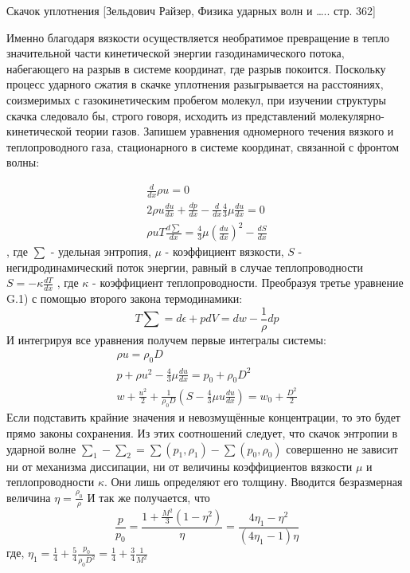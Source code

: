 \documentclass[10pt, a4paper]{article}
\numberwithin{equation}{section}
\begin{document}
Скачок уплотнения [Зельдович Райзер, Физика ударных волн и ….. стр. 362]


Именно благодаря вязкости осуществляется необратимое превращение в тепло значительной части кинетической энергии газодинамического потока, набегающего на разрыв в системе координат, где разрыв покоится. 
Поскольку процесс ударного сжатия в скачке уплотнения разыгрывается на расстояниях, соизмеримых с газокинетическим пробегом молекул, при изучении структуры скачка следовало бы, строго говоря, исходить из представлений молекулярно-кинетической теории газов. 
Запишем уравнения одномерного течения вязкого и теплопроводного газа, стационарного в системе координат, связанной с фронтом волны: 

\begin{eqnarray}
	\frac{d}{dx} \rho u =0 \\
	2 \rho u \frac{du}{dx} + \frac{dp}{dx}-\frac{d}{dx} \frac{4}{3} \mu \frac{du}{dx} =0 \\
	 \rho uT \frac{d \sum}{dx}=\frac{4}{3} \mu (\frac{du}{dx})^{2} - \frac{dS}{dx}
\end{eqnarray}
, где $\sum$ - удельная энтропия, $\mu$  - коэффициент вязкости, $S$ - негидродинамический поток энергии, равный в случае теплопроводности $S=-\kappa \frac{dT}{dx}$ , где $\kappa$ - коэффициент теплопроводности.
Преобразуя третье уравнение G.1) с помощью второго закона термодинамики: 
\begin{equation}
	T \sum = d \epsilon + p dV = dw  - \frac{1}{\rho} dp 
\end{equation}
И интегрируя все уравнения получем первые интегралы системы:
\begin{eqnarray}
	\rho u = \rho_0 D \\  p+\rho u^{2} - \frac{4}{3} \mu \frac{du}{dx} = p_0 + \rho_0 D^{2} \\  w + \frac{u^{2}}{2} + \frac{1}{\rho_0 D} (S - \frac{4}{3} \mu u \frac{du}{dx}) = w_0 + \frac{D^{2}}{2}
\end{eqnarray}
Если подставить крайние значения и невозмущённые концентрации, то это будет прямо законы сохранения. 
Из этих соотношений следует, что скачок энтропии в ударной волне $\sum_1 - \sum_2 = \sum (p_1, \rho_1) - \sum (p_0, \rho_0)$  совершенно не зависит ни от механизма диссипации, ни от величины коэффициентов вязкости $\mu$ и теплопроводности $\kappa$. Они лишь определяют его толщину.
Вводится безразмерная величина $\eta = \frac{\rho_0}{\rho} $
И так же получается, что
\begin{equation}
	\frac{p}{p_0}=\frac{1 + \frac{M^{2}}{3} (1-\eta^{2})}{\eta}=\frac{4 \eta_1 - \eta^{2}}{(4 \eta_1 -1) \eta}
\end{equation}
где, $\eta_1 = \frac{1}{4}+\frac{5}{4} \frac{p_0}{\rho_0 D^{2}}=  \frac{1}{4} + \frac{3}{4} \frac{1}{M^{2}}$
\end{document}
